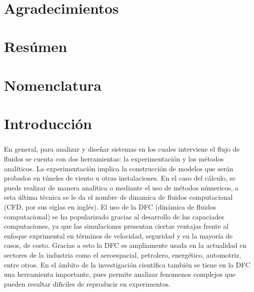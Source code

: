 \documentclass[letterpaper, openright, 12pt]{book}
\begin{document}
	\newpage
	\begin{flushright}
		\textit{}
	\end{flushright}
	\ %

	\chapter*{Agradecimientos}

	\chapter*{Resúmen}

	\tableofcontents
	
	\cleardoublepage
	\listoffigures


	\cleardoublepage
	\listoftables
	\cleardoublepage

	\chapter*{Nomenclatura}

	\chapter*{Introducción}
	\paragraph*{}
    En general, para analizar y diseñar sistemas en los cuales interviene el
    flujo de fluidos se cuenta con dos herramientas: la experimentación y los
    métodos analíticos. La experimentación implica la construcción de modelos
    que serán probados en túneles de viento u otras instalaciones. En el caso
    del cálculo, se puede realizar de manera analítica o mediante el uso de
    métodos númericos, a esta última técnica se le da el nombre de dinamica de
    fluidos computacional (CFD, por sus siglas en inglés). El uso de la DFC
    (dinámica de fluidos computacional) se ha popularizado gracias al
    desarrollo de las capaciades computaciones, ya que las simulaciones
    presentan ciertas ventajas frente al enfoque exprimental en términos de
    velocidad, seguridad y en la mayoría de casos, de costo. Gracias a esto la
    DFC es ampliamente usada en la actualidad en sectores de la industria como
    el aeroespacial, petrolero, energético, automotriz, entre otros. En el
    ámbito de la investigación científica también se tiene en la DFC una
    herramienta importante, pues permite analizar fenomenos complejos que
    pueden resultar dificiles de reproducir en experimentos.
\end{document}
